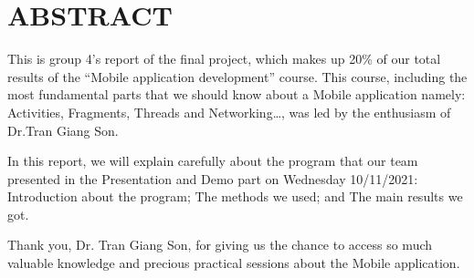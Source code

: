 \newpage
\vspace{6cm}
\section{ABSTRACT}
\hspace{0.7cm}This is group 4’s report of the final project, which makes up 20\% of our total results of the “Mobile application development” course. This course, including the most fundamental parts that we should know about a Mobile application namely: Activities, Fragments, Threads and Networking…, was led by the enthusiasm of Dr.Tran Giang Son.

\vspace{0.7cm}In this report, we will explain carefully about the program that our team presented in the Presentation and Demo part on Wednesday 10/11/2021: Introduction about the program; The methods we used; and The main results we got.

\vspace{0.7cm}Thank you, Dr. Tran Giang Son, for giving us the chance to access so much valuable knowledge and precious practical sessions about the Mobile application. 


	
	
	
